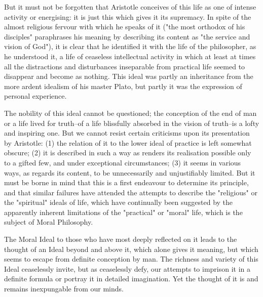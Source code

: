 But it must not be forgotten that Aristotle conceives of this life as
one of intense activity or energising: it is just this which gives it
its supremacy. In spite of the almost religious fervour with which he
speaks of it ("the most orthodox of his disciples" paraphrases his
meaning by describing its content as "the service and vision of God"),
it is clear that he identified it with the life of the philosopher, as
he understood it, a life of ceaseless intellectual activity in which at
least at times all the distractions and disturbances inseparable from
practical life seemed to disappear and become as nothing. This ideal was
partly an inheritance from the more ardent idealism of his master Plato,
but partly it was the expression of personal experience.

The nobility of this ideal cannot be questioned; the conception of the
end of man or a life lived for truth--of a life blissfully absorbed in
the vision of truth--is a lofty and inspiring one. But we cannot resist
certain criticisms upon its presentation by Aristotle: (1) the relation
of it to the lower ideal of practice is left somewhat obscure; (2) it is
described in such a way as renders its realisation possible only to a
gifted few, and under exceptional circumstances; (3) it seems in various
ways, as regards its content, to be unnecessarily and unjustifiably
limited. But it must be borne in mind that this is a first endeavour to
determine its principle, and that similar failures have attended the
attempts to describe the "religious" or the "spiritual" ideals of
life, which have continually been suggested by the apparently inherent
limitations of the "practical" or "moral" life, which is the subject of
Moral Philosophy.

The Moral Ideal to those who have most deeply reflected on it leads
to the thought of an Ideal beyond and above it, which alone gives it
meaning, but which seems to escape from definite conception by man.
The richness and variety of this Ideal ceaselessly invite, but as
ceaselessly defy, our attempts to imprison it in a definite formula or
portray it in detailed imagination. Yet the thought of it is and remains
inexpungable from our minds.

